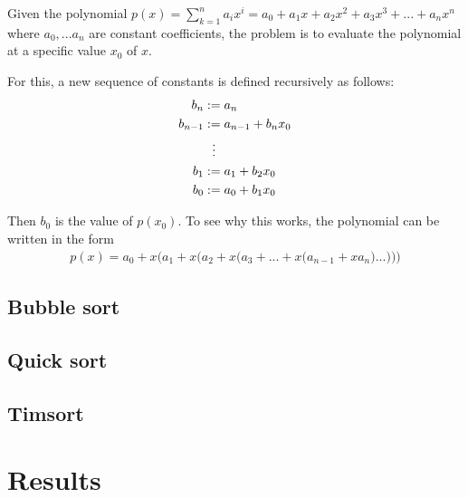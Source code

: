 \documentclass[a4paper,article,14pt]{extarticle}
\begin{document}
	Given the polynomial $p(x)=\sum_{k=1}^n a_i x^i=a_0+a_1 x+a_2 x^2+a_3 x^3+...+a_n x^n$ where $a_0,...a_n$ are constant coefficients, the problem is to evaluate the polynomial at a specific value $x_0$ of $x$.
	
	For this, a new sequence of constants is defined recursively as follows:
	\begin{align}
	b_n &:= a_n \\
	b_{n-1 } &:= a_{n-1}+b_n x_0 \\
	&\vdotswithin{:=} \notag \\
	b_1 &:= a_1+b_2 x_0\\
	b_0 &:= a_0+b_1x_0
	\end{align}
	
	Then $b_0$ is the value of $p(x_0)$. To see why this works, the polynomial can be written in the form 
	\begin{align}
	p(x)=a_0 +x\Bigg(a_1+x\bigg(a_2+x\Big(a_3+...+x\big(a_{n-1} + xa_n\big)...\Big)\bigg)\Bigg)
	\end{align}
	
	\subsection{Bubble sort}
	
	\subsection{Quick sort}
	
	\subsection{Timsort}
	
	\section{Results}
\end{document}
